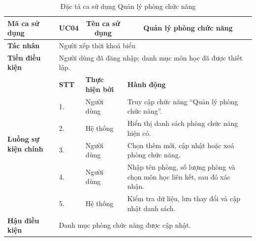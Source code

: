 \documentclass[../DoAn.tex]{subfiles}
\begin{document}
\begin{longtable}{|p{2.8cm}|p{1cm}|p{2.8cm}|p{6.3cm}|}
\caption{Đặc tả ca sử dụng Quản lý phòng chức năng}
\label{tab:app_uc_quan_ly_phong} \\
\hline
\multicolumn{1}{|l|}{\textbf{Mã ca sử dụng}} & \multicolumn{1}{c|}{UC04} &
\multicolumn{1}{c|}{\textbf{Tên ca sử dụng}} & \multicolumn{1}{c|}{Quản lý phòng chức năng} \\
\hline
\multicolumn{1}{|l|}{\textbf{Tác nhân}} & \multicolumn{3}{l|}{Người xếp thời khoá biểu} \\
\hline
\multicolumn{1}{|l|}{\textbf{Tiền điều kiện}} & \multicolumn{3}{l|}{Người dùng đã đăng nhập; danh mục môn học đã được thiết lập.} \\
\hline
\multirow{6}{2.8cm}{\textbf{Luồng sự kiện chính}} & \textbf{STT} & \textbf{Thực hiện bởi} & \textbf{Hành động} \\
\cline{2-4}
& 1. & Người dùng & Truy cập chức năng ``Quản lý phòng chức năng''. \\
\cline{2-4}
& 2. & Hệ thống & Hiển thị danh sách phòng chức năng hiện có. \\
\cline{2-4}
& 3. & Người dùng & Chọn thêm mới, cập nhật hoặc xoá phòng chức năng. \\
\cline{2-4}
& 4. & Người dùng & Nhập tên phòng, số lượng phòng và chọn môn học liên kết, sau đó xác nhận. \\
\cline{2-4}
& 5. & Hệ thống & Kiểm tra dữ liệu, lưu thay đổi và cập nhật danh sách. \\
\hline
\multicolumn{1}{|l|}{\textbf{Hậu điều kiện}} & \multicolumn{3}{p{10.5cm}|}{Danh mục phòng chức năng được cập nhật.} \\
\hline
\end{longtable}
\end{document}
